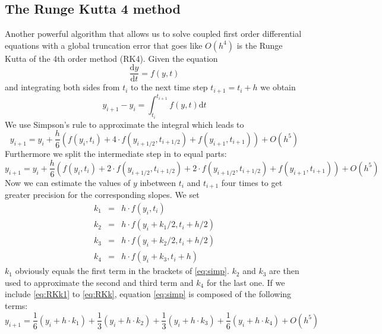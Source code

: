 \documentclass[11pt,a4wide]{article}
\begin{document}
 \subsection{The Runge Kutta 4 method}
Another powerful algorithm that allows us to solve coupled first order differential equations with a global truncation error that goes like $O(h^4)$ is the Runge Kutta of the 4th order method (RK4). Given the equation
\begin{equation}
\dfrac{\mathrm d y}{\mathrm dt}=f(y,t)
\label{eq:diff1}
\end{equation}
and integrating both sides from $t_i$ to the next time step $t_{i+1}=t_i+h$ we obtain
\begin{equation}
y_{i+1}-y_i=\displaystyle\int_{t_i}^{t_{i+1}}f(y,t)\mathrm dt
\label{eq:int1}
\end{equation}
We use Simpson's rule to approximate the integral  which leads to
\begin{equation}
y_{i+1}=y_i+\dfrac{h}{6}\left(f(y_i,t_i)+4\cdot f(y_{i+1/2},t_{i+1/2})+f(y_{i+1},t_{i+1})\right) +O(h^5)
\label{eq:simp}
\end{equation}
Furthermore we split the intermediate step in to equal parts:
\begin{equation}
y_{i+1}=y_i+\dfrac{h}{6}\left(f(y_i,t_i)+2\cdot f(y_{i+1/2},t_{i+1/2})+2\cdot f(y_{i+1/2},t_{i+1/2})+f(y_{i+1},t_{i+1})\right) +O(h^5)
\label{eq:simp}
\end{equation}
Now we can estimate the values of $y$ inbetween $t_i$ and $t_{i+1}$ four times to get greater precision for the corresponding slopes.  We set
	\begin{eqnarray}
	k_1&=&h\cdot f(y_i,t_i)\\
	\label{eq:RKk1}
	k_2&=&h\cdot f(y_i+k_1/2,t_i+h/2)\\
	k_3&=&h\cdot f(y_i+k_2/2,t_i+h/2)\\
	k_4&=&h\cdot f(y_i+k_3,t_i+h)
	\label{eq:RKk}
	\end{eqnarray}
	$k_1$ obviously equals the first term in the brackets of \ref{eq:simp}. $k_2$ and $k_3$ are then used to approximate the second and third term and $k_4$ for the last one. If we include \ref{eq:RKk1} to \ref{eq:RKk}, equation \ref{eq:simp} is composed of the following terms:
\begin{equation}
y_{i+1}=\dfrac{1}{6}\left(y_i+h\cdot k_1\right) +\dfrac{1}{3}\left(y_i+h\cdot k_2\right)+\dfrac{1}{3}\left(y_i+h\cdot k_3\right)+\dfrac{1}{6}\left(y_i+h\cdot k_4\right) +O(h^5)
\label{eq:simpk}
\end{equation}
\end{document}

